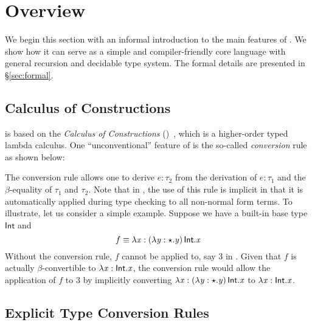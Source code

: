 \section{Overview}


We begin this section with an informal introduction to the main features of \name. We show how it can serve as a simple and compiler-friendly core language with general recursion and decidable type system. The formal details are presented in \S\ref{sec:formal}.

\subsection{Calculus of Constructions}
\label{sec:coc}

\name is based on the \emph{Calculus of Constructions} (\coc)~\cite{coc}, which is a higher-order typed lambda calculus. One ``unconventional'' feature of \coc is the so-called \emph{conversion} rule as shown below:
\renewcommand{\ottpremise}[1]{\enskip #1 \enskip}
\ottusedrule{\ottdruleTccXXConv{}}

The conversion rule allows one to derive $e:\tau_{{\mathrm{2}}}$ from the derivation of $e:\tau_{{\mathrm{1}}}$ and the $\beta$-equality of $\tau_{{\mathrm{1}}}$ and $\tau_{{\mathrm{2}}}$. Note that in \coc, the use of this rule is implicit in that it is automatically applied during type checking to all non-normal form terms. To illustrate, let us consider a simple example. Suppose we have a built-in base type $ \mathsf{Int} $ and \[f \equiv \lambda  \mathit{x}  :  (  \lambda  \mathit{y}  :  \star  .  \mathit{y}  ) \, \mathsf{Int}  .  \mathit{x} \] Without the conversion rule, $f$ cannot be applied to, say $3$ in \coc. Given that $f$ is actually $\beta$-convertible to $\lambda  \mathit{x}  :  \mathsf{Int}  .  \mathit{x}$, the conversion rule would allow the application of $f$ to $3$ by implicitly converting $\lambda  \mathit{x}  :  (  \lambda  \mathit{y}  :  \star  .  \mathit{y}  ) \, \mathsf{Int}  .  \mathit{x}$ to $\lambda  \mathit{x}  :  \mathsf{Int}  .  \mathit{x}$.

\subsection{Explicit Type Conversion Rules}

